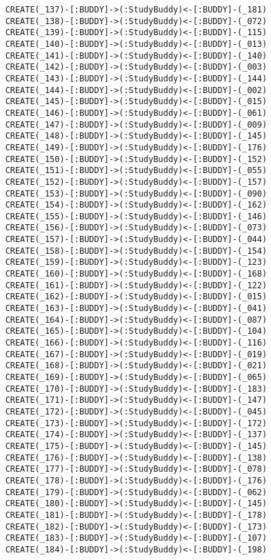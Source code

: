 \begin{lstlisting}
	CREATE(_137)-[:BUDDY]->(:StudyBuddy)<-[:BUDDY]-(_181)
	CREATE(_138)-[:BUDDY]->(:StudyBuddy)<-[:BUDDY]-(_072)
	CREATE(_139)-[:BUDDY]->(:StudyBuddy)<-[:BUDDY]-(_115)
	CREATE(_140)-[:BUDDY]->(:StudyBuddy)<-[:BUDDY]-(_013)
	CREATE(_141)-[:BUDDY]->(:StudyBuddy)<-[:BUDDY]-(_140)
	CREATE(_142)-[:BUDDY]->(:StudyBuddy)<-[:BUDDY]-(_003)
	CREATE(_143)-[:BUDDY]->(:StudyBuddy)<-[:BUDDY]-(_144)
	CREATE(_144)-[:BUDDY]->(:StudyBuddy)<-[:BUDDY]-(_002)
	CREATE(_145)-[:BUDDY]->(:StudyBuddy)<-[:BUDDY]-(_015)
	CREATE(_146)-[:BUDDY]->(:StudyBuddy)<-[:BUDDY]-(_061)
	CREATE(_147)-[:BUDDY]->(:StudyBuddy)<-[:BUDDY]-(_009)
	CREATE(_148)-[:BUDDY]->(:StudyBuddy)<-[:BUDDY]-(_145)
	CREATE(_149)-[:BUDDY]->(:StudyBuddy)<-[:BUDDY]-(_176)
	CREATE(_150)-[:BUDDY]->(:StudyBuddy)<-[:BUDDY]-(_152)
	CREATE(_151)-[:BUDDY]->(:StudyBuddy)<-[:BUDDY]-(_055)
	CREATE(_152)-[:BUDDY]->(:StudyBuddy)<-[:BUDDY]-(_157)
	CREATE(_153)-[:BUDDY]->(:StudyBuddy)<-[:BUDDY]-(_090)
	CREATE(_154)-[:BUDDY]->(:StudyBuddy)<-[:BUDDY]-(_162)
	CREATE(_155)-[:BUDDY]->(:StudyBuddy)<-[:BUDDY]-(_146)
	CREATE(_156)-[:BUDDY]->(:StudyBuddy)<-[:BUDDY]-(_073)
	CREATE(_157)-[:BUDDY]->(:StudyBuddy)<-[:BUDDY]-(_044)
	CREATE(_158)-[:BUDDY]->(:StudyBuddy)<-[:BUDDY]-(_154)
	CREATE(_159)-[:BUDDY]->(:StudyBuddy)<-[:BUDDY]-(_123)
	CREATE(_160)-[:BUDDY]->(:StudyBuddy)<-[:BUDDY]-(_168)
	CREATE(_161)-[:BUDDY]->(:StudyBuddy)<-[:BUDDY]-(_122)
	CREATE(_162)-[:BUDDY]->(:StudyBuddy)<-[:BUDDY]-(_015)
	CREATE(_163)-[:BUDDY]->(:StudyBuddy)<-[:BUDDY]-(_041)
	CREATE(_164)-[:BUDDY]->(:StudyBuddy)<-[:BUDDY]-(_087)
	CREATE(_165)-[:BUDDY]->(:StudyBuddy)<-[:BUDDY]-(_104)
	CREATE(_166)-[:BUDDY]->(:StudyBuddy)<-[:BUDDY]-(_116)
	CREATE(_167)-[:BUDDY]->(:StudyBuddy)<-[:BUDDY]-(_019)
	CREATE(_168)-[:BUDDY]->(:StudyBuddy)<-[:BUDDY]-(_021)
	CREATE(_169)-[:BUDDY]->(:StudyBuddy)<-[:BUDDY]-(_065)
	CREATE(_170)-[:BUDDY]->(:StudyBuddy)<-[:BUDDY]-(_183)
	CREATE(_171)-[:BUDDY]->(:StudyBuddy)<-[:BUDDY]-(_147)
	CREATE(_172)-[:BUDDY]->(:StudyBuddy)<-[:BUDDY]-(_045)
	CREATE(_173)-[:BUDDY]->(:StudyBuddy)<-[:BUDDY]-(_172)
	CREATE(_174)-[:BUDDY]->(:StudyBuddy)<-[:BUDDY]-(_137)
	CREATE(_175)-[:BUDDY]->(:StudyBuddy)<-[:BUDDY]-(_145)
	CREATE(_176)-[:BUDDY]->(:StudyBuddy)<-[:BUDDY]-(_138)
	CREATE(_177)-[:BUDDY]->(:StudyBuddy)<-[:BUDDY]-(_078)
	CREATE(_178)-[:BUDDY]->(:StudyBuddy)<-[:BUDDY]-(_176)
	CREATE(_179)-[:BUDDY]->(:StudyBuddy)<-[:BUDDY]-(_062)
	CREATE(_180)-[:BUDDY]->(:StudyBuddy)<-[:BUDDY]-(_145)
	CREATE(_181)-[:BUDDY]->(:StudyBuddy)<-[:BUDDY]-(_178)
	CREATE(_182)-[:BUDDY]->(:StudyBuddy)<-[:BUDDY]-(_173)
	CREATE(_183)-[:BUDDY]->(:StudyBuddy)<-[:BUDDY]-(_107)
	CREATE(_184)-[:BUDDY]->(:StudyBuddy)<-[:BUDDY]-(_198)

\end{lstlisting}

